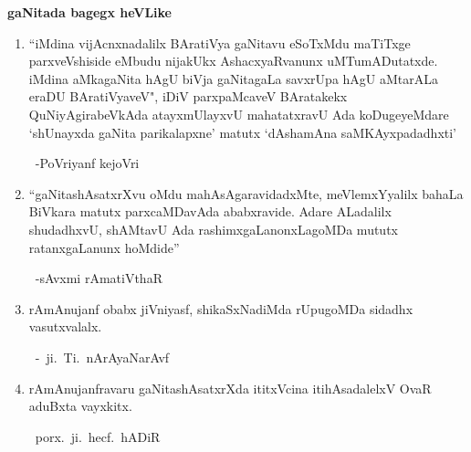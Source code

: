 \begin{center}
{\bf gaNitada bagegx heVLike} 
\end{center}
\begin{enumerate}[\rm 1)]
\item ``iMdina vijAcnxnadalilx BAratiVya gaNitavu eSoTxMdu maTiTxge parxveVshiside eMbudu nijakUkx AshacxyaRvanunx uMTumADutatxde. iMdina aMkagaNita hAgU biVja gaNitagaLa savxrUpa hAgU aMtarALa eraDU BAratiVyaveV", iDiV parxpaMcaveV BAratakekx QuNiyAgirabeVkAda atayxmUlayxvU mahatatxravU Ada koDugeyeMdare `shUnayxda gaNita parikalapxne' matutx `dAshamAna saMKAyxpadadhxti'

~\hfill -PoVriyanf kejoVri

\item ``gaNitashAsatxrXvu oMdu mahAsAgaravidadxMte, meVlemxYyalilx bahaLa BiVkara matutx parxcaMDavAda ababxravide. Adare ALadalilx shudadhxvU, shAMtavU Ada rashimxgaLanonxLagoMDa mututx ratanxgaLanunx hoMdide''

~\hfill -sAvxmi rAmatiVthaR

\item rAmAnujanf obabx jiVniyasf, shikaSxNadiMda rUpugoMDa sidadhx vasutxvalalx. 

~\hfill -~ji.~Ti.~nArAyaNarAvf

\item rAmAnujanfravaru gaNitashAsatxrXda ititxVcina itihAsadalelxV OvaR aduBxta vayxkitx. 

~\hfill porx.~ji.~hecf.~hADiR 
\end{enumerate}
